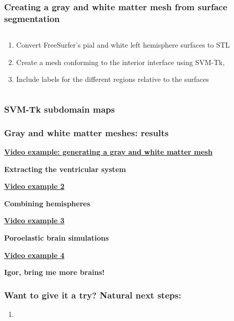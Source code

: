 \documentclass[10pt, mathserif, aspectratio=169, t]{beamer}
\newcommand{\mysection}[1]{\begin{frame} \begin{center} \vspace{3em} \textbf{#1} \end{center} \end{frame}}
\newcommand{\videosection}[3]{\begin{frame} \begin{center} \vspace{3em} \href{#2}{\textcolor{rognesred}{\textbf{#1}}} \end{center} #3 \end{frame}}
\begin{document}
\begin{frame}
\frametitle{Creating a gray and white matter mesh from surface segmentation}

\begin{columns}
\begin{column}{0.5\textwidth}
\begin{enumerate}
\item
  Convert FreeSurfer's pial and white left hemisphere surfaces to STL
\item
  Create a mesh conforming to the interior interface using SVM-Tk,
\item
  Include labels for the different regions relative to the surfaces
\end{enumerate}
\end{column}
\begin{column}{0.5\textwidth}
\end{column}

\end{columns}
\end{frame}

\begin{frame}
\frametitle{SVM-Tk subdomain maps}
\end{frame}

\begin{frame}
\frametitle{Gray and white matter meshes: results}
\end{frame}

\videosection{Video example: generating a gray and white matter mesh}{}{}

\mysection{Extracting the ventricular system}

\videosection{Video example 2}{}{}

\mysection{Combining hemispheres}

\videosection{Video example 3}{}{}

\mysection{Poroelastic brain simulations}

\videosection{Video example 4}{}{}



\mysection{Igor, bring me more brains!}
 
\begin{frame}
\frametitle{Want to give it a try? Natural next steps:}
\begin{enumerate}
\item
\end{enumerate}
\end{frame}

\end{document}
